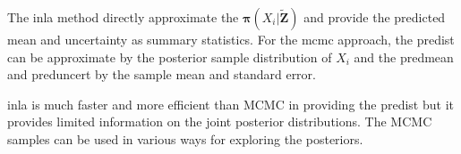 \documentclass[a4paper,12pt]{article}
\begin{document}
The \acrshort{inla} method directly approximate the $\bm{\pi}(X_i | \bm{\tilde{Z}})$ and provide the predicted mean and uncertainty as summary statistics. For the \acrshort{mcmc} approach, the \gls{predist} can be approximate by the posterior sample distribution of $X_i$ and the \gls{predmean} and \gls{preduncert} by the sample mean and standard error.

\acrshort{inla} is much faster and more efficient than MCMC in providing the \gls{predist} but it provides limited information on the joint posterior distributions. The MCMC samples can be used in various ways for exploring the posteriors.



\clearpage
 
\printglossary[type=\acronymtype]
 
\printglossary
 


\end{document}
